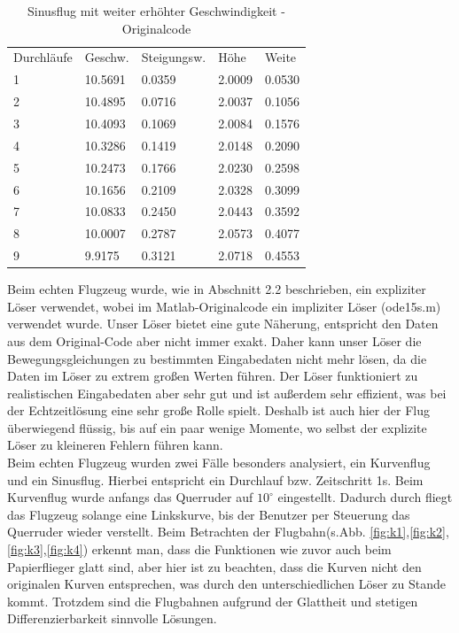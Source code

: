 \documentclass[a4paper,12pt]{scrartcl}
\begin{document}
\begin{table}
\centering
\caption{Sinusflug mit weiter erhöhter Geschwindigkeit - Originalcode}
\begin{tabular}{lllll}
Durchläufe & Geschw.  & Steigungsw. & Höhe   & Weite      \\
1          & 10.5691 & 0.0359     & 2.0009 &  0.0530  \\
2          & 10.4895 & 0.0716     & 2.0037 &  0.1056  \\
3          & 10.4093 & 0.1069     & 2.0084 &  0.1576  \\
4          & 10.3286 & 0.1419     & 2.0148 &  0.2090  \\
5          & 10.2473 & 0.1766     & 2.0230 &  0.2598  \\
6          & 10.1656 & 0.2109     & 2.0328 &  0.3099  \\
7          & 10.0833 & 0.2450     & 2.0443 &  0.3592  \\
8          & 10.0007 & 0.2787     & 2.0573 &  0.4077  \\
9          & 9.9175 & 0.3121     & 2.0718 &  0.4553 
\end{tabular}
\end{table}
\newpage
Beim echten Flugzeug wurde, wie in Abschnitt 2.2 beschrieben, ein expliziter Löser verwendet,
wobei im Matlab-Originalcode ein impliziter Löser (ode15s.m) verwendet wurde.
Unser Löser bietet eine gute Näherung, entspricht den Daten aus dem Original-Code aber
nicht immer exakt. Daher kann unser Löser die Bewegungsgleichungen zu bestimmten
Eingabedaten nicht mehr lösen, da die Daten im Löser zu extrem großen Werten führen.
Der Löser funktioniert zu realistischen Eingabedaten aber sehr gut und ist außerdem
sehr effizient, was bei der Echtzeitlösung eine sehr große Rolle spielt. Deshalb ist auch
hier der Flug überwiegend flüssig, bis auf ein paar wenige Momente, wo selbst der explizite
Löser zu kleineren Fehlern führen kann.\\
Beim echten Flugzeug wurden zwei Fälle besonders analysiert, ein Kurvenflug und ein Sinusflug.
Hierbei entspricht ein Durchlauf bzw. Zeitschritt 1s. 
Beim Kurvenflug wurde anfangs das Querruder auf \(10^\circ\) eingestellt. Dadurch durch fliegt
das Flugzeug solange eine Linkskurve, bis der Benutzer per Steuerung das Querruder
wieder verstellt. Beim Betrachten der Flugbahn(s.Abb. \ref{fig:k1},\ref{fig:k2},\ref{fig:k3},\ref{fig:k4}) erkennt man, dass die Funktionen wie zuvor auch beim Papierflieger glatt sind, aber hier ist zu beachten, dass die Kurven nicht den originalen Kurven entsprechen, was durch den unterschiedlichen Löser zu Stande kommt. Trotzdem sind die Flugbahnen aufgrund der Glattheit und stetigen Differenzierbarkeit sinnvolle Lösungen.
\end{document}
